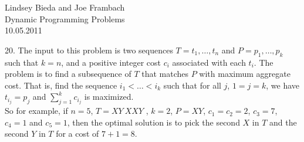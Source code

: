 \documentclass[10pt]{article}
\begin{document}
	\begin{flushright}
	Lindsey Bieda and Joe Frambach\\
	Dynamic Programming Problems\\
	10.05.2011
	\end{flushright}
	20. The input to this problem is two sequences $T = t_1, \ldots, t_n$ and $P = p_1, \ldots, p_k$ such that $k = n$, and
	a positive integer cost $c_i$ associated with each $t_i$.  The problem is to find a subsequence of $T$ that
	matches $P$ with maximum aggregate cost. That is, find the sequence $i_1 < \ldots < i_k$ such that for all $j$,
	$1 = j = k$, we have $t_{i_j} = p_j$ and $\sum_{j=1}^k c_{i_j}$ is maximized.\\
	So for example, if $n = 5$, $T = XY~XXY$ , $k = 2$, $P = XY$, $c_1 = c_2 = 2$, $c_3 = 7$, $c_4 = 1$ and $c_5 = 1$, then
	the optimal solution is to pick the second $X$ in $T$ and the second $Y$ in $T$ for a cost of $7 + 1 = 8$.
\end{document}
